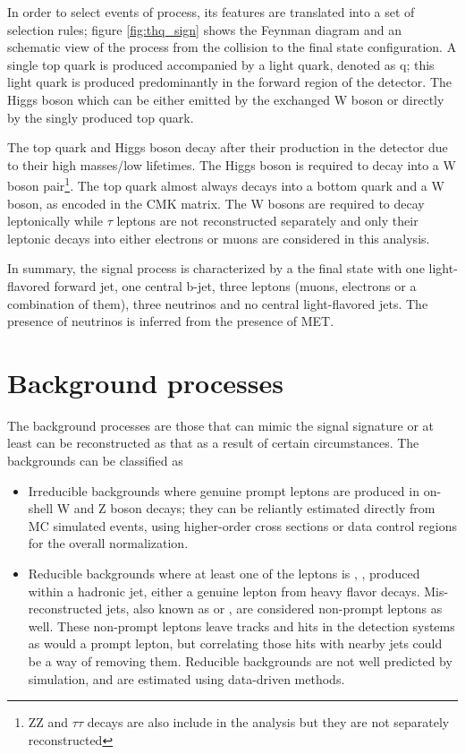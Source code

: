 In order to select events of \tHq process, its features are translated into a set of selection rules; figure \ref{fig:thq_sign} shows the Feynman diagram and an schematic view of the \tHq process from the \pp collision to the final state configuration. A single top quark is produced accompanied by a light quark, denoted as q; this light quark is produced predominantly in the forward region of the detector. The Higgs boson which can be either emitted by the exchanged W boson or directly by the singly produced top quark.

The top quark and Higgs boson decay after their production in the detector due to their high masses/low lifetimes. The Higgs boson is required to decay into a W boson pair\footnote{ZZ and $\tau\tau$ decays are also include in the analysis but they are not separately reconstructed}. The top quark almost always decays into a bottom quark and a W boson, as encoded in the CMK matrix. The W bosons are required to decay leptonically while $\tau$ leptons are not reconstructed separately and only their leptonic decays into either electrons or muons are considered in this analysis.

In summary, the signal process is characterized by a the final state with one light-flavored forward jet, one central b-jet, three leptons (muons, electrons or a combination of them), three neutrinos and no central light-flavored jets. The presence of neutrinos is inferred from the presence of MET.

\section{Background processes}\label{sec:bg}

The background processes are those that can mimic the signal signature or at least can be reconstructed as that as a result of certain circumstances. The backgrounds can be classified as

\begin{itemize}

\item Irreducible backgrounds where genuine prompt leptons are produced in on-shell W and Z boson decays; they can be reliantly estimated directly from MC simulated events, using higher-order cross sections or data control regions for the overall normalization.

\item Reducible backgrounds where at least one of the leptons is , \ie, produced within a hadronic jet, either a genuine lepton from heavy flavor decays. Mis-reconstructed jets, also known as  or , are considered non-prompt leptons as well. These non-prompt leptons leave tracks and hits in the detection systems as would a prompt lepton, but correlating those hits with nearby jets could be a way of removing them. Reducible backgrounds are not well predicted by simulation, and are estimated using data-driven methods.
\end{itemize}

